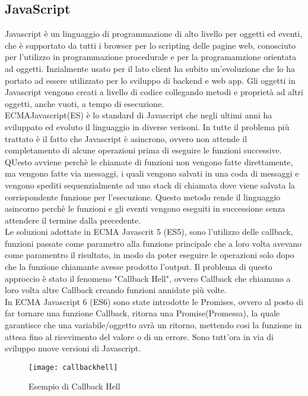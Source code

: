\subsection{JavaScript}
Javascript \`e un linguaggio di programmazione di alto livello per oggetti ed eventi, che \`e supportato da tutti i browser
per lo scripting delle pagine web, conosciuto per l'utilizzo in programmazione procedurale e per la programamzione orientata ad oggetti.
Inzialmente usato per il lato client ha subito un'evoluzione che lo ha portato ad essere utilizzato per lo sviluppo di backend e web app.
Gli oggetti in Javascript vengono creati a livello di codice collegando metodi e propriet\`a ad altri oggetti, anche vuoti, a tempo
di esecuzione.
\\[2\baselineskip]
ECMAJavascript(ES) \`e lo standard di Javascript che negli ultimi anni ha sviluppato ed evoluto il linguaggio in diverse verisoni.
In tutte il problema pi\`u trattato \`e il fatto che Javascript \`e asincrono, ovvero non attende il completamento di alcune
operazioni prima di eseguire le funzioni successive. QUesto avviene perch\`e le chiamate di funzioni non vengono fatte direttamente, ma vengono
fatte via messaggi, i quali vengono salvati in una coda di messaggi e vengono spediti sequenzialmente ad uno stack di chiamata dove
viene salvata la corrispondente funzione per l'esecuzione. Questo metodo rende il linguaggio asincorno perch\`e le funzioni e gli eventi
vengono eseguiti in successione senza attendere il termine dalla precedente.
\\[1\baselineskip]Le soluzioni adottate in ECMA Javascrit 5 (ES5), sono l'utilizzo delle callback,
funzioni passate come parametro alla funzione principale che a loro volta avevano come paramentro il risultato, in modo da poter eseguire le operazioni
solo dopo che la funzione chiamante avesse prodotto l'output. Il problema di questo approccio \`e stato il fenomeno "Callback Hell", ovvero Callback che chiamano a loro volta
altre Callback creando funzioni annidate pi\`u volte.
\\[1\baselineskip]
In ECMA Javascript 6 (ES6) sono state introdotte le Promises, ovvero al posto di far tornare una funzione Callback, ritorna una Promise(Promessa),
la quale garantisce che una variabile/oggetto avr\`a un ritorno, mettendo cosi la funzione in attesa fino al ricevimento del valore o di un errore.
Sono tutt'ora in via di sviluppo nuove versioni di Javascript.
\\[2\baselineskip]
\begin{figure}[h]
    \texttt{[image: callbackhell]}
    \caption{Esempio di Callback Hell}
\end{figure}

